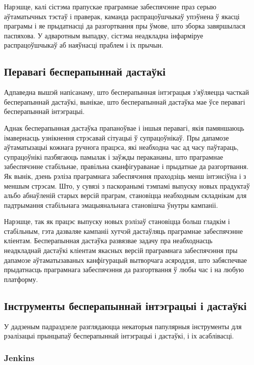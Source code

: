 Нарэшце, калі сістэма прапускае праграмнае забеспячэнне
праз серыю аўтаматычных тэстаў і праверак, каманда распрацоўшчыкаў
упэўнена ў якасці праграмы і яе прыдатнасці да разгортвання
пры ўмове, што зборка завяршылася паспяхова.
У адваротным выпадку, сістэма неадкладна інфарміруе распрацоўшчыкаў
аб наяўнасці праблем і іх прычын.

\subsection{Перавагі бесперапыннай дастаўкі}

Адпаведна вышэй напісанаму, што бесперапынная інтэграцыя з'яўляецца
часткай бесперапыннай дастаўкі, вынікае, што бесперапыннай дастаўка
мае ўсе перавагі бесперапыннай інтэграцыі.

Аднак бесперапынная дастаўка прапаноўвае і іншыя перавагі, якія
памяншаюць іма\-вер\-насць узнікнення стрэсавай сітуацыі ў супрацоўнікаў.
Пры дапамозе аўтаматызацыі кожнага ручнога працэса, які неабходна
час ад часу паўтараць, супрацоўнікі пазбягаюць памылак і заўжды
перакананы, што праграмнае забеспячэнне стабільнае, правільна
сканфігураванае і прыдатнае да разгортвання.
Як вынік, дзень рэліза праграмнага забеспячэння праходзіць менш
інтэнсіўна і з меншым стрэсам.
Што, у сувязі з паскоранымі тэмпамі выпуску новых прадуктаў
альбо абнаўленій старых версій праграм, становіцца неабходным складнікам
для падтрымання стабільнага эмацыянальнага становішча ўнутры кампаніі.

Нарэшце, так як працэс выпуску новых рэлізаў становіцца больш гладкім і
стабільным, гэта дазваляе кампаніі хутчэй дастаўляць
праграмнае забеспячэнне кліентам.
Бесперапынная дастаўка развязвае задачу пра неабходнасць
неадкладнай дастаўкі кліентам якасных версій праграмнага забеспячэння
пры дапамозе аўтаматызаваных канфігурацый вытворчага асяроддзя, што
забяспечвае прыдатнасць праграмнага забеспячэння да разгортвання
ў любы час і на любую платформу.


\subsection{Інструменты бесперапыннай інтэграцыі і дастаўкі}

У дадзеным падраздзеле разглядаюцца некаторыя папулярныя інструменты для
рэалізацыі прынцыпаў бесперапыннай інтэграцыі і дастаўкі,
і іх асаблівасці.

\subsubsection{Jenkins}

